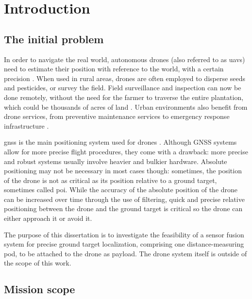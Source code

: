 
\chapter{Introduction}
\label{cap:intro}

\section{The initial problem}

In order to navigate the real world, autonomous drones (also referred to as \gls{uav}s)
need to estimate their position
with reference to the world, with a certain precision \cite{introLivro1}. When used in
rural areas, drones are often employed to disperse seeds and pesticides, or survey the field.
Field surveillance and inspection can now be done remotely, without the need for the
farmer to traverse the entire plantation, which could be thousands of acres of land
 \cite{introArtigo1}. Urban environments also benefit from drone services, from preventive
 maintenance services \cite{droneurban1} to emergency response infrastructure \cite{droneurban2}
\cite{droneurban3}.

\gls{gnss} is the main positioning system used for drones \cite{introLivro2}. Although GNSS
systems allow for more precise flight procedures, they come with a drawback: more precise and
robust systems usually involve heavier and bulkier hardware. Absolute positioning may not be
necessary in most cases though: sometimes, the position of the drone is not as critical as its
position relative to a ground target, sometimes called \gls{poi}. While the accuracy of
the absolute position of the drone can be increased over time through the use of filtering,
quick and precise relative positioning between the drone and the ground target is critical so
the drone can either approach it or avoid it.

The purpose of this dissertation is to investigate the feasibility of a sensor fusion system
for precise ground target localization, comprising one distance-measuring pod, to be attached
to the drone as payload. The drone system itself is outside of the scope of this work.

\section{Mission scope}

